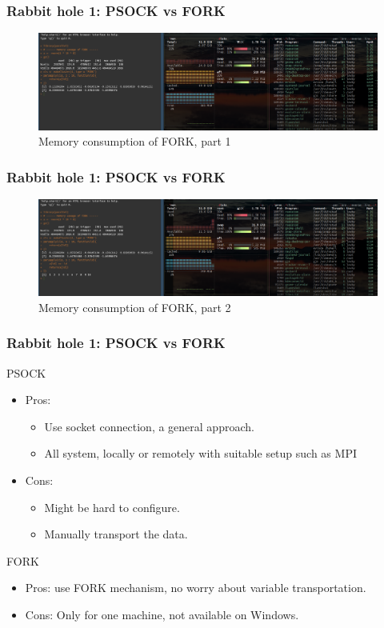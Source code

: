 \documentclass[aspectratio=169,xcolor={dvipsnames,table}]{beamer}
\begin{document}
\begin{frame}
  \frametitle{Rabbit hole 1: PSOCK vs FORK}
  \begin{figure}[htbp]
    \centering
    \includegraphics[width = \textwidth]{fork_start}
    \caption{Memory consumption of FORK, part 1}
  \end{figure}
\end{frame}

\begin{frame}
  \frametitle{Rabbit hole 1: PSOCK vs FORK}
  \begin{figure}[htbp]
    \centering
    \includegraphics[width = \textwidth]{fork_transport}
    \caption{Memory consumption of FORK, part 2}
  \end{figure}
\end{frame}

\begin{frame}
  \frametitle{Rabbit hole 1: PSOCK vs FORK}
  \begin{block}{PSOCK}
    \begin{itemize}
    \item Pros:
      \begin{itemize}
      \item Use socket connection, a general approach.
      \item All system, locally or remotely with suitable setup such as MPI
      \end{itemize}
    \item Cons:
      \begin{itemize}
      \item Might be hard to configure.
      \item Manually transport the data.
      \end{itemize}
    \end{itemize}
  \end{block}
  \begin{block}{FORK}
    \begin{itemize}
    \item Pros: use FORK mechanism, no worry about variable transportation.
    \item Cons: Only for one machine, not available on Windows.
    \end{itemize}
  \end{block}
\end{frame}
\end{document}
